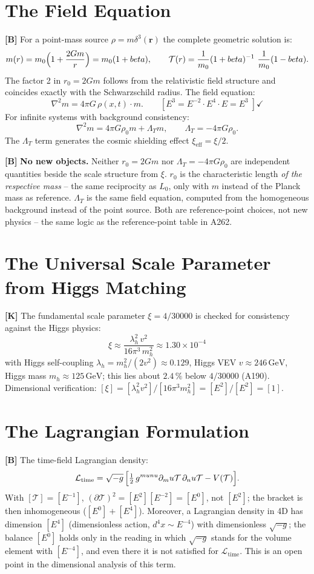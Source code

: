 \section{The Field Equation}

\textbf{[B]} For a point-mass source $\rho=m\delta^3(\mathbf r)$ the complete
geometric solution is:
\[
  m(r) = m_0\Bigl(1+\frac{2Gm}{r}\Bigr) = m_0(1+\beta),
  \qquad
  \mathcal T(r) = \frac{1}{m_0}(1+\beta)^{-1}\approx\frac{1}{m_0}(1-\beta).
\]
The factor 2 in $r_0=2Gm$ follows from the relativistic field structure and
coincides exactly with the Schwarzschild radius. The field equation:
\[
  \nabla^2 m = 4\pi G\,\rho(x,t)\cdot m.
  \qquad [E^3 = E^{-2}\cdot E^4\cdot E = E^3\;]\checkmark
\]
For infinite systems with background consistency:
\[
  \nabla^2 m = 4\pi G\rho_0 m + \Lambda_T m,
  \qquad \Lambda_T = -4\pi G\rho_0.
\]
The $\Lambda_T$ term generates the cosmic shielding effect $\xi_\text{eff}=\xi/2$.

\textbf{[B]} \textbf{No new objects.} Neither $r_0=2Gm$ nor
$\Lambda_T=-4\pi G\rho_0$ are independent quantities beside the scale structure
from $\xi$. $r_0$ is the characteristic length \emph{of the respective mass} --
the same reciprocity as $L_0$, only with $m$ instead of the Planck mass as
reference. $\Lambda_T$ is the same field equation, computed from the homogeneous
background instead of the point source. Both are reference-point choices, not new
physics -- the same logic as the reference-point table in A262.

\section{The Universal Scale Parameter from Higgs Matching}

\textbf{[K]} The fundamental scale parameter $\xi = 4/30000$ is checked for consistency against the
Higgs physics:
\[
  \boxed{\;\xi \approx \frac{\lambda_h^2\,v^2}{16\pi^3\,m_h^2}
  \approx 1{.}30\times10^{-4}\;}
\]
with Higgs self-coupling $\lambda_h = m_h^2/(2v^2)\approx0{.}129$, Higgs VEV $v\approx246\,\text{GeV}$,
Higgs mass $m_h\approx125\,\text{GeV}$; this lies about $2.4\,\%$ below $4/30000$ (A190). Dimensional verification:
$[\xi]=[\lambda_h^2 v^2]/[16\pi^3 m_h^2]=[E^2]/[E^2]=[1]$.

\section{The Lagrangian Formulation}

\textbf{[B]} The time-field Lagrangian density:
\[
  \mathcal L_\text{time}
  = \sqrt{-g}\,\Bigl[
    \tfrac12\,g^{\mu\nu}\partial_\mu\mathcal T\,\partial_\nu\mathcal T
    - V(\mathcal T)
  \Bigr].
\]
With $[\mathcal T]=[E^{-1}]$, $(\partial\mathcal T)^2=[E^2][E^{-2}]=[E^0]$, not $[E^2]$; the bracket is then inhomogeneous ($[E^0]+[E^4]$). Moreover, a Lagrangian density in 4D has dimension $[E^4]$ (dimensionless action, $d^4x\sim E^{-4}$) with dimensionless $\sqrt{-g}$; the balance $[E^0]$ holds only in the reading in which $\sqrt{-g}$ stands for the volume element with $[E^{-4}]$, and even there it is not satisfied for $\mathcal L_\text{time}$. This is an open point in the dimensional analysis of this term.

